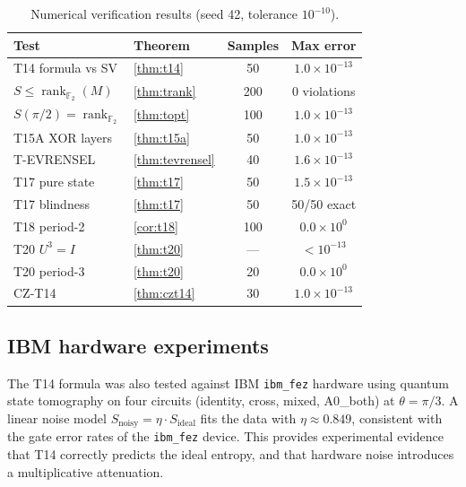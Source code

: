\documentclass[11pt,a4paper]{article}
\newcommand{\F}{\mathbb{F}}
\newcommand{\rk}{\operatorname{rank}_{\F_2}}
\newcommand{\VNE}{S}
\begin{document}
\begin{table}[h]
\centering
\begin{tabular}{llcc}
\toprule
Test & Theorem & Samples & Max error \\
\midrule
T14 formula vs SV  & \cref{thm:t14}       & 50  & $1.0 \times 10^{-13}$ \\
$\VNE \leq \rk(M)$ & \cref{thm:trank}     & 200 & $0$ violations        \\
$\VNE(\pi/2)=\rk$  & \cref{thm:topt}      & 100 & $1.0 \times 10^{-13}$ \\
T15A XOR layers    & \cref{thm:t15a}      & 50  & $1.0 \times 10^{-13}$ \\
T-EVRENSEL         & \cref{thm:tevrensel} & 40  & $1.6 \times 10^{-13}$ \\
T17 pure state     & \cref{thm:t17}       & 50  & $1.5 \times 10^{-13}$ \\
T17 blindness      & \cref{thm:t17}       & 50  & 50/50 exact           \\
T18 period-2       & \cref{cor:t18}       & 100 & $0.0 \times 10^{0}$   \\
T20 $U^3 = I$      & \cref{thm:t20}       & ---  & $< 10^{-13}$         \\
T20 period-3       & \cref{thm:t20}       & 20  & $0.0 \times 10^{0}$   \\
CZ-T14             & \cref{thm:czt14}     & 30  & $1.0 \times 10^{-13}$ \\
\bottomrule
\end{tabular}
\caption{Numerical verification results (seed 42, tolerance $10^{-10}$).}
\label{tab:results}
\end{table}

\subsection{IBM hardware experiments}

The T14 formula was also tested against IBM \texttt{ibm\_fez} hardware using
quantum state tomography on four circuits (identity, cross, mixed, A0\_both)
at $\theta = \pi/3$.  A linear noise model $\VNE_{\mathrm{noisy}} = \eta \cdot
\VNE_{\mathrm{ideal}}$ fits the data with $\eta \approx 0.849$, consistent
with the gate error rates of the \texttt{ibm\_fez} device.  This provides
experimental evidence that T14 correctly predicts the ideal entropy, and that
hardware noise introduces a multiplicative attenuation.

\end{document}
